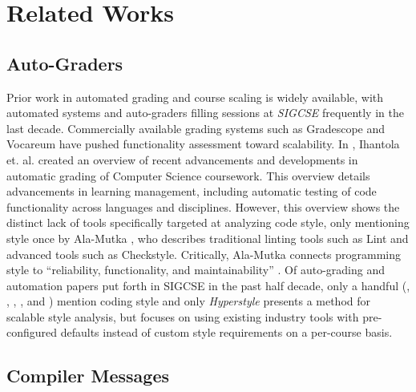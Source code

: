 \documentclass[sigconf]{acmart}
\begin{document}
\section{Related Works}

\subsection{Auto-Graders}

Prior work in automated grading and course scaling is widely available,
with automated systems and auto-graders filling sessions at \textit{SIGCSE} frequently
in the last decade. Commercially available grading systems such as Gradescope
and Vocareum have pushed functionality assessment toward scalability. In
\cite{10.1145/1930464.1930480}, Ihantola et.
al. created an overview of recent advancements and developments in automatic
grading of Computer Science coursework. This overview
details advancements in learning management, including automatic testing of code
functionality across languages and disciplines. However, this overview shows the
distinct lack of tools specifically targeted at analyzing code style, only mentioning
style once by Ala-Mutka \cite{doi:10.1080/08993400500150747}, who describes
traditional linting tools such as Lint and advanced tools such as Checkstyle.
Critically, Ala-Mutka connects programming style to ``reliability, functionality, and
maintainability'' \cite{doi:10.1080/08993400500150747}. Of auto-grading and automation
papers put forth in SIGCSE in the past
half decade, only a handful (\cite{birillo_hyperstyle_2022}, \cite{groeneveld_are_2022}, \cite{wiese_readable_2022}, \cite{crichton_automating_2021}, and \cite{leite_effects_2020}) mention coding style and only \textit{Hyperstyle} \cite{birillo_hyperstyle_2022} presents a method for scalable style analysis, but focuses on using existing industry tools with pre-configured defaults instead of custom style requirements on a per-course basis.

\subsection{Compiler Messages}
\end{document}
